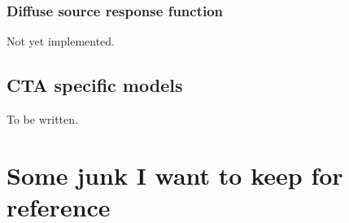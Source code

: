 \documentclass{article}[12pt,a4]
\begin{document}
\subsubsection{Diffuse source response function}

Not yet implemented.


\subsection{CTA specific models}

To be written.


\newpage
\section{Some junk I want to keep for reference}
\end{document}
